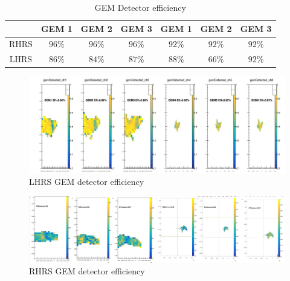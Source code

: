 \begin{table}[]
    \centering
    \begin{tabular}{c|c|c|c|c|c|c} \hline
         ~ & GEM 1 & GEM 2 & GEM 3 & GEM 1 & GEM 2 & GEM 3 \\ \hline 
         RHRS & $96\%$ & $96\%$ & $96\%$ & $92\%$& $92\%$& $92\%$  \\ \hline
         LHRS & $86\%$& $84\%$ & $87\%$ & $88\%$ & $66\%$ & $92\%$ \\ \hline
    \end{tabular}
    \caption{GEM Detector efficiency}
    \label{tab:gem_detector_efficiency_table}
\end{table}

\begin{figure}[!htbp]
    \centering
    \includegraphics[width=\textwidth]{images/chap5/lhrs_efficiency_2d.png}
    \caption{LHRS GEM detector efficiency}
    \label{fig:lhrs_efficiency_2d}
\end{figure}

\begin{figure}[!htbp]
    \centering
    \includegraphics[width=\textwidth]{images/chap5/rhrs_efficiency_2d.png}
    \caption{RHRS GEM detector efficiency}
    \label{fig:rhrs_efficiency_2d}
\end{figure}

